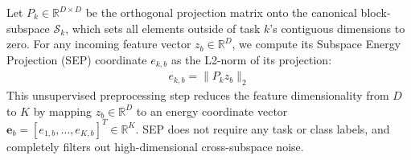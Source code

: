 Let $P_k \in \mathbb{R}^{D \times D}$ be the orthogonal projection matrix onto the canonical block-subspace $\mathcal{S}_k$, which sets all elements outside of task $k$'s contiguous dimensions to zero. For any incoming feature vector $z_b \in \mathbb{R}^D$, we compute its Subspace Energy Projection (SEP) coordinate $e_{k, b}$ as the L2-norm of its projection:
\begin{align}
    e_{k, b} = \|P_k z_b\|_2
\end{align}
This unsupervised preprocessing step reduces the feature dimensionality from $D$ to $K$ by mapping $z_b \in \mathbb{R}^D$ to an energy coordinate vector $\mathbf{e}_b = [e_{1, b}, \dots, e_{K, b}]^T \in \mathbb{R}^K$. SEP does not require any task or class labels, and completely filters out high-dimensional cross-subspace noise.

